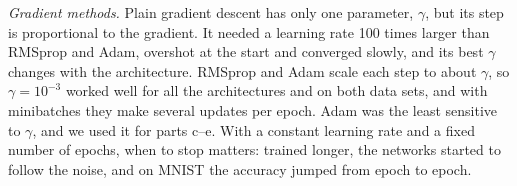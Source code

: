 \emph{Gradient methods.} Plain gradient descent has only one parameter, $\gamma$, but its step is proportional to the gradient. It needed a learning rate 100 times larger than RMSprop and Adam, overshot at the start and converged slowly, and its best $\gamma$ changes with the architecture. RMSprop and Adam scale each step to about $\gamma$, so $\gamma = 10^{-3}$ worked well for all the architectures and on both data sets, and with minibatches they make several updates per epoch. Adam was the least sensitive to $\gamma$, and we used it for parts c--e. With a constant learning rate and a fixed number of epochs, when to stop matters: trained longer, the networks started to follow the noise, and on MNIST the accuracy jumped from epoch to epoch.
